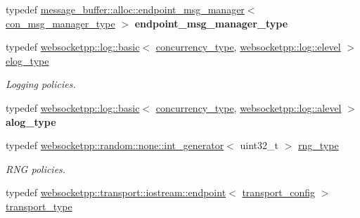 \begin{DoxyCompactItemize}
\item 
typedef \hyperlink{classwebsocketpp_1_1message__buffer_1_1alloc_1_1endpoint__msg__manager}{message\+\_\+buffer\+::alloc\+::endpoint\+\_\+msg\+\_\+manager}$<$ \hyperlink{classwebsocketpp_1_1message__buffer_1_1alloc_1_1con__msg__manager}{con\+\_\+msg\+\_\+manager\+\_\+type} $>$ {\bfseries endpoint\+\_\+msg\+\_\+manager\+\_\+type}\hypertarget{structwebsocketpp_1_1config_1_1core_ac2a5caeef488e2f177bb8f92a37d2f34}{}\label{structwebsocketpp_1_1config_1_1core_ac2a5caeef488e2f177bb8f92a37d2f34}

\item 
typedef \hyperlink{classwebsocketpp_1_1log_1_1basic}{websocketpp\+::log\+::basic}$<$ \hyperlink{classwebsocketpp_1_1concurrency_1_1basic}{concurrency\+\_\+type}, \hyperlink{structwebsocketpp_1_1log_1_1elevel}{websocketpp\+::log\+::elevel} $>$ \hyperlink{structwebsocketpp_1_1config_1_1core_ac037ffb73b675a6251f3b86433b4eb17}{elog\+\_\+type}\hypertarget{structwebsocketpp_1_1config_1_1core_ac037ffb73b675a6251f3b86433b4eb17}{}\label{structwebsocketpp_1_1config_1_1core_ac037ffb73b675a6251f3b86433b4eb17}

\begin{DoxyCompactList}\small\item\em Logging policies. \end{DoxyCompactList}\item 
typedef \hyperlink{classwebsocketpp_1_1log_1_1basic}{websocketpp\+::log\+::basic}$<$ \hyperlink{classwebsocketpp_1_1concurrency_1_1basic}{concurrency\+\_\+type}, \hyperlink{structwebsocketpp_1_1log_1_1alevel}{websocketpp\+::log\+::alevel} $>$ {\bfseries alog\+\_\+type}\hypertarget{structwebsocketpp_1_1config_1_1core_a3b2c116aa4077f10b085f008b48028e2}{}\label{structwebsocketpp_1_1config_1_1core_a3b2c116aa4077f10b085f008b48028e2}

\item 
typedef \hyperlink{classwebsocketpp_1_1random_1_1none_1_1int__generator}{websocketpp\+::random\+::none\+::int\+\_\+generator}$<$ uint32\+\_\+t $>$ \hyperlink{structwebsocketpp_1_1config_1_1core_a245db33d05f7994d221db66f506ab8c6}{rng\+\_\+type}\hypertarget{structwebsocketpp_1_1config_1_1core_a245db33d05f7994d221db66f506ab8c6}{}\label{structwebsocketpp_1_1config_1_1core_a245db33d05f7994d221db66f506ab8c6}

\begin{DoxyCompactList}\small\item\em R\+NG policies. \end{DoxyCompactList}\item 
typedef \hyperlink{classwebsocketpp_1_1transport_1_1iostream_1_1endpoint}{websocketpp\+::transport\+::iostream\+::endpoint}$<$ \hyperlink{structwebsocketpp_1_1config_1_1core_1_1transport__config}{transport\+\_\+config} $>$ \hyperlink{structwebsocketpp_1_1config_1_1core_a378afa38a0e66a4d9a1a865ad1b2d13d}{transport\+\_\+type}\hypertarget{structwebsocketpp_1_1config_1_1core_a378afa38a0e66a4d9a1a865ad1b2d13d}{}\label{structwebsocketpp_1_1config_1_1core_a378afa38a0e66a4d9a1a865ad1b2d13d}


\end{DoxyCompactItemize}
